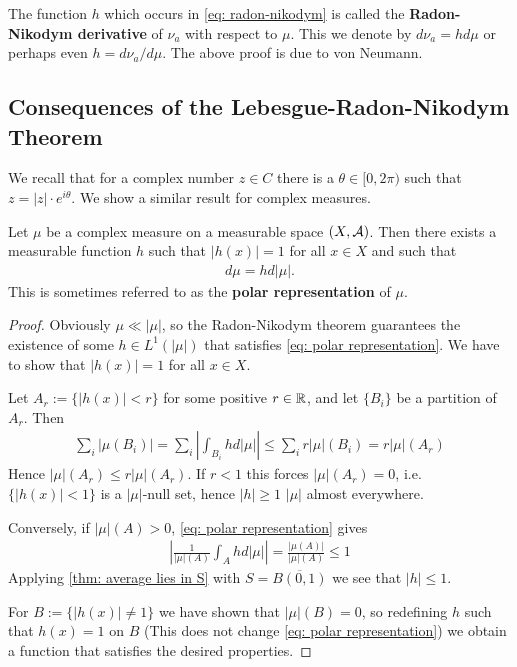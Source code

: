 \documentclass[../../main.tex]{subfiles}
\begin{document}
The function $h$ which occurs in \eqref{eq: radon-nikodym} is called the \textbf{Radon-Nikodym derivative} of $\nu_{a}$ with respect to $\mu$. This we denote by $d\nu_{a}=hd\mu$ or perhaps even $h=d\nu_{a}/ d\mu$. The above proof is due to von Neumann.


\subsection{Consequences of the Lebesgue-Radon-Nikodym Theorem}

We recall that for a complex number $z\in C$ there is a $\theta\in [0,2\pi)$ such that $z=|z|\cdot e^{i\theta}$. We show a similar result for complex measures.

\begin{theorem}\label{thm: polar representation}
Let $\mu$ be a complex measure on a measurable space $(X, \mathcal{A})$. Then there exists a measurable function $h$ such that $|h(x)|=1$ for all $x\in X$ and such that
\begin{align}
	d\mu=hd|\mu|. \label{eq: polar representation}
\end{align}
This is sometimes referred to as the \textbf{polar representation} of $\mu$.
\end{theorem}
\begin{proof}
Obviously $\mu \ll |\mu|$, so the Radon-Nikodym theorem guarantees the existence of some $h\in L^{1}(|\mu|)$ that satisfies \eqref{eq: polar representation}. We have to show that $|h(x)|=1$ for all $x\in X$.

Let $A_{r}:=\{|h(x)|<r\}$ for some positive $r\in \mathbb{R}$, and let $\{B_{i}\}$ be a partition of $A_{r}$. Then
\begin{align*}
	\sum_{i}|\mu(B_{i})|=\sum_{i}\left| \int_{B_{i}}hd|\mu| \right| \le \sum_{i} r|\mu|(B_{i})=r|\mu|(A_{r})
\end{align*}
Hence $|\mu|(A_{r})\le r|\mu|(A_{r})$. If $r<1$ this forces $|\mu|(A_{r})=0$, i.e. $\{|h(x)|<1\}$ is a $|\mu|$-null set, hence $|h|\ge 1$ $|\mu|$ almost everywhere.

Conversely, if $|\mu|(A)>0$, \eqref{eq: polar representation} gives
\begin{align*}
	\left| \frac{1}{|\mu|(A)} \int_{A}hd|\mu| \right|=\frac{|\mu(A)|}{|\mu|(A)}\le 1
\end{align*}
Applying \cref{thm: average lies in S} with $S=\overline{B(0,1)}$ we see that $|h|\le 1$.

For $B:=\{|h(x)|\neq 1\}$ we have shown that $|\mu|(B)=0$, so redefining $h$ such that $h(x)=1$ on $B$ (This does not change \eqref{eq: polar representation}) we obtain a function that satisfies the desired properties.
\end{proof}
\end{document}
